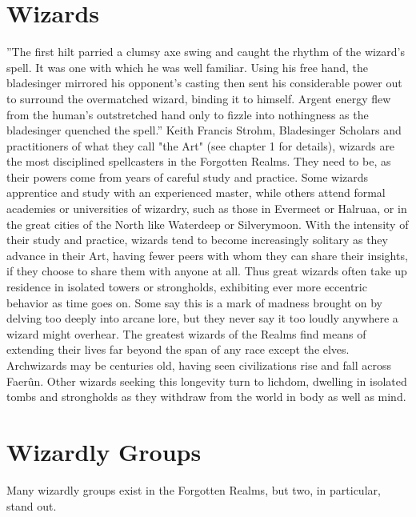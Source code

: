 \documentclass[10pt,a4paper,twoside,twocolumn,openany,bg=print,nodeprecatedcode]{dndbook}
\begin{document}
\section{Wizards}
\DndQuote%
{}
{''The first hilt parried a clumsy axe swing and caught the rhythm of the wizard's spell. It was one with which he was well familiar. Using his free hand, the bladesinger mirrored his opponent's casting then sent his considerable power out to surround the overmatched wizard, binding it to himself. Argent energy flew from the human's outstretched hand only to fizzle into nothingness as the bladesinger quenched the spell.''}
{Keith Francis Strohm, Bladesinger}
Scholars and practitioners of what they call "the Art" (see chapter 1 for details), wizards are the most disciplined spellcasters in the Forgotten Realms. They need to be, as their powers come from years of careful study and practice. Some wizards apprentice and study with an experienced master, while others attend formal academies or universities of wizardry, such as those in Evermeet or Halruaa, or in the great cities of the North like Waterdeep or Silverymoon.
With the intensity of their study and practice, wizards tend to become increasingly solitary as they advance in their Art, having fewer peers with whom they can share their insights, if they choose to share them with anyone at all. Thus great wizards often take up residence in isolated towers or strongholds, exhibiting ever more eccentric behavior as time goes on. Some say this is a mark of madness brought on by delving too deeply into arcane lore, but they never say it too loudly anywhere a wizard might overhear.
The greatest wizards of the Realms find means of extending their lives far beyond the span of any race except the elves. Archwizards may be centuries old, having seen civilizations rise and fall across Faerûn. Other wizards seeking this longevity turn to lichdom, dwelling in isolated tombs and strongholds as they withdraw from the world in body as well as mind.
\section{Wizardly Groups}
Many wizardly groups exist in the Forgotten Realms, but two, in particular, stand out.
\end{document}
